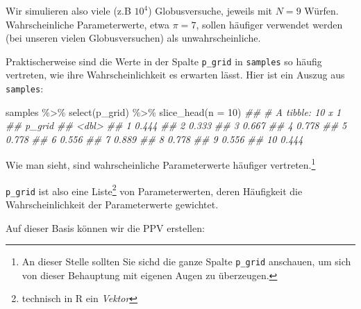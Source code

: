 \documentclass[
  a4paper,
  DIV=11]{scrreprt}
\newenvironment{Shaded}{\begin{snugshade}}{\end{snugshade}}
\newcommand{\AttributeTok}[1]{\textcolor[rgb]{0.40,0.45,0.13}{#1}}
\newcommand{\DecValTok}[1]{\textcolor[rgb]{0.68,0.00,0.00}{#1}}
\newcommand{\DocumentationTok}[1]{\textcolor[rgb]{0.37,0.37,0.37}{\textit{#1}}}
\newcommand{\FloatTok}[1]{\textcolor[rgb]{0.68,0.00,0.00}{#1}}
\newcommand{\FunctionTok}[1]{\textcolor[rgb]{0.28,0.35,0.67}{#1}}
\newcommand{\NormalTok}[1]{\textcolor[rgb]{0.00,0.23,0.31}{#1}}
\newcommand{\OtherTok}[1]{\textcolor[rgb]{0.00,0.23,0.31}{#1}}
\newcommand{\SpecialCharTok}[1]{\textcolor[rgb]{0.37,0.37,0.37}{#1}}
\theoremstyle{definition}
\theoremstyle{remark}
\begin{document}
Wir simulieren also viele (z.B \(10^4\)) Globusversuche, jeweils mit
\(N=9\) Würfen. Wahrscheinliche Parameterwerte, etwa \(\pi=7\), sollen
häufiger verwendet werden (bei unseren vielen Globusversuchen) als
unwahrscheinliche.

Praktischerweise sind die Werte in der Spalte \texttt{p\_grid} in
\texttt{samples} so häufig vertreten, wie ihre Wahrscheinlichkeit es
erwarten lässt. Hier ist ein Auszug aus \texttt{samples}:

\begin{Shaded}
\begin{Highlighting}[]
\NormalTok{samples }\SpecialCharTok{\%\textgreater{}\%} 
  \FunctionTok{select}\NormalTok{(p\_grid) }\SpecialCharTok{\%\textgreater{}\%} 
  \FunctionTok{slice\_head}\NormalTok{(}\AttributeTok{n =} \DecValTok{10}\NormalTok{)}
\DocumentationTok{\#\# \# A tibble: 10 x 1}
\DocumentationTok{\#\#    p\_grid}
\DocumentationTok{\#\#     \textless{}dbl\textgreater{}}
\DocumentationTok{\#\#  1  0.444}
\DocumentationTok{\#\#  2  0.333}
\DocumentationTok{\#\#  3  0.667}
\DocumentationTok{\#\#  4  0.778}
\DocumentationTok{\#\#  5  0.778}
\DocumentationTok{\#\#  6  0.556}
\DocumentationTok{\#\#  7  0.889}
\DocumentationTok{\#\#  8  0.778}
\DocumentationTok{\#\#  9  0.556}
\DocumentationTok{\#\# 10  0.444}
\end{Highlighting}
\end{Shaded}

Wie man sieht, sind wahrscheinliche Parameterwerte häufiger
vertreten.\footnote{An dieser Stelle sollten Sie sichd die ganze Spalte
  \texttt{p\_grid} anschauen, um sich von dieser Behauptung mit eigenen
  Augen zu überzeugen.}

\texttt{p\_grid} ist also eine Liste\footnote{technisch in R ein
  \emph{Vektor}} von Parameterwerten, deren Häufigkeit die
Wahrscheinlichkeit der Parameterwerte gewichtet.

Auf dieser Basis können wir die PPV erstellen:

\begin{Shaded}
\end{Shaded}
\end{document}
